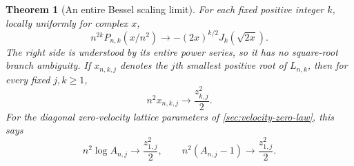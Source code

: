 \documentclass[11pt]{article}
\numberwithin{equation}{section}
\newtheorem{theorem}{Theorem}[section]
\theoremstyle{definition}
\theoremstyle{remark}
\begin{document}
\begin{theorem}[An entire Bessel scaling limit]
\label{thm:bessel-edge}
For each fixed positive integer $k$, locally uniformly for complex $x$,
\begin{equation}\label{eq:bessel-limit}
 n^{2k}P_{n,k}(x/n^2)
       \longrightarrow -(2x)^{k/2}J_k(\sqrt{2x}).
\end{equation}
The right side is understood by its entire power series, so it has
no square-root branch ambiguity. If $x_{n,k,j}$ denotes the $j$th
smallest positive root of $L_{n,k}$, then for every fixed $j,k\geq1$,
\begin{equation}\label{eq:small-root-limit}
 n^2x_{n,k,j}\longrightarrow \frac{z_{k,j}^2}{2}.
\end{equation}
For the diagonal zero-velocity lattice parameters of
\cref{sec:velocity-zero-law}, this says
\begin{equation}\label{eq:small-spacing-limit}
 n^2\log A_{n,j}\longrightarrow \frac{z_{1,j}^2}{2},
 \qquad n^2(A_{n,j}-1)\longrightarrow\frac{z_{1,j}^2}{2}.
\end{equation}
\end{theorem}
\end{document}

